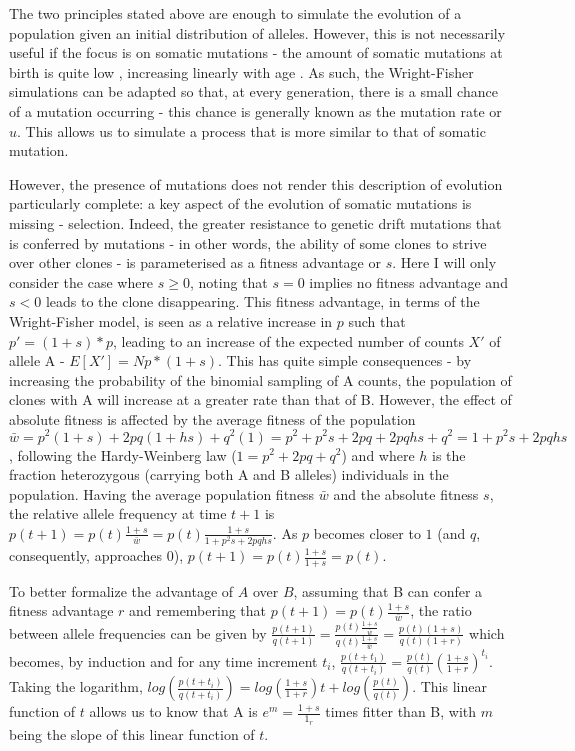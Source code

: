The two principles stated above are enough to simulate the evolution of a population given an initial distribution of alleles. However, this is not necessarily useful if the focus is on somatic mutations - the amount of somatic mutations at birth is quite low \cite{SpencerChapman_2021_gjz4x4}, increasing linearly with age \cite{Abascal_2021_gjvqfm}. As such, the Wright-Fisher simulations can be adapted so that, at every generation, there is a small chance of a mutation occurring - this chance is generally known as the mutation rate or $u$. This allows us to simulate a process that is more similar to that of somatic mutation.

However, the presence of mutations does not render this description of evolution particularly complete: a key aspect of the evolution of somatic mutations is missing - selection. Indeed, the greater resistance to genetic drift mutations that is conferred by mutations - in other words, the ability of some clones to strive over other clones - is parameterised as a fitness advantage or $s$. Here I will only consider the case where $s \geq 0$, noting that $s = 0$ implies no fitness advantage and $s < 0$ leads to the clone disappearing. This fitness advantage, in terms of the Wright-Fisher model, is seen as a relative increase in $p$ such that $p' = (1+s)*p$, leading to an increase of the expected number of counts $X'$ of allele A - $E[X'] = Np*(1+s)$. This has quite simple consequences - by increasing the probability of the binomial sampling of A counts, the population of clones with A will increase at a greater rate than that of B. However, the effect of absolute fitness is affected by the average fitness of the population $\bar{w} = p^2(1+s) + 2pq(1+hs) + q^2(1) = p^2 + p^2s + 2pq + 2pqhs + q^2 = 1 + p^2s + 2pqhs$, following the Hardy-Weinberg law ($1 = p^2 + 2pq + q^2$) and where $h$ is the fraction heterozygous (carrying both A and B alleles) individuals in the population. Having the average population fitness $\bar{w}$ and the absolute fitness $s$, the relative allele frequency at time $t+1$ is $p(t+1) = p(t)\frac{1+s}{\bar{w}} = p(t)\frac{1+s}{1 + p^2s + 2pqhs}$. As $p$ becomes closer to $1$ (and $q$, consequently, approaches $0$), $p(t+1) = p(t)\frac{1+s}{1+s} = p(t)$. 

To better formalize the advantage of $A$ over $B$, assuming that B can confer a fitness advantage $r$ and remembering that $p(t+1) = p(t)\frac{1+s}{\bar{w}}$, the ratio between allele frequencies can be given by $\frac{p(t+1)}{q(t+1)} = \frac{p(t)\frac{1+s}{\bar{w}}}{q(t)\frac{1+s}{\bar{w}}} = \frac{p(t)(1+s)}{q(t)(1+r)}$ which becomes, by induction and for any time increment $t_i$, $\frac{p(t+t_1)}{q(t+t_i)}=\frac{p(t)}{q(t)}(\frac{1+s}{1+r})^{t_i}$. Taking the logarithm, $log(\frac{p(t+t_i)}{q(t+t_i)}) = log(\frac{1+s}{1+r})t + log(\frac{p(t)}{q(t)})$. This linear function of $t$ allows us to know that A is $e^{m} = \frac{1+s}{1_r}$ times fitter than B, with $m$ being the slope of this linear function of $t$. 

